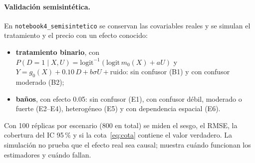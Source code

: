 \paragraph{Validación semisintética.} En \texttt{notebook4\_semisintetico} se conservan las covariables reales y se simulan el tratamiento y el precio con un efecto conocido:
\begin{itemize}[itemsep=0pt]
\item \textbf{tratamiento binario}, con $P(D=1\mid X,U)=\mathrm{logit}^{-1}(\mathrm{logit}\,m_0(X)+aU)$ y $Y=g_0(X)+0.10\,D+b\sigma U+\text{ruido}$: sin confusor (B1) y con confusor moderado (B2);
\item \textbf{baños}, con efecto 0.05: sin confusor (E1), con confusor débil, moderado o fuerte (E2--E4), heterogéneo (E5) y con dependencia espacial (E6).
\end{itemize}
Con 100 réplicas por escenario (800 en total) se miden el sesgo, el RMSE, la cobertura del IC 95\,\% y si la cota~\eqref{eq:cota} contiene el valor verdadero. La simulación no prueba que el efecto real sea causal; muestra cuándo funcionan los estimadores y cuándo fallan.
